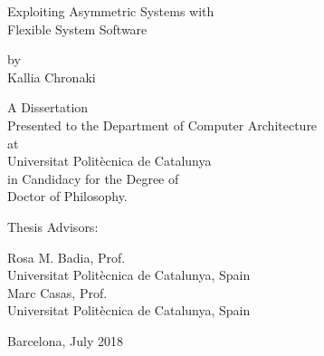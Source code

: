 \thispagestyle{empty}

\begin{center}

{\LARGE Exploiting Asymmetric Systems with \\
    \vspace{0.5em}
    Flexible System Software}

\vspace{1.0cm}

\begin{large}
    {\large by}\\
{\large Kallia Chronaki}\\
\vspace{.5cm}
\end{large}

\vspace{2.0cm}

{\large A Dissertation \\
    Presented to the Department of Computer Architecture \\
    at \\
    Universitat Polit\`ecnica de Catalunya\\
    in Candidacy for the Degree of \\
    Doctor of Philosophy.}
\end{center}

\vspace{2.2cm}%

{\large Thesis Advisors:}%

\vspace{1.0cm}%

{\hspace{0em} \large Rosa M. Badia, Prof.}\\
{\hspace*{1.4em} \large Universitat Polit\`ecnica de Catalunya, Spain}\\


\vspace*{1.0cm}%
{\hspace{0cm} \large Marc Casas, Prof.}\\
{\hspace*{1.4em} \large Universitat Polit\`ecnica de Catalunya, Spain}%
\vspace*{2.0cm}

\begin{center}
{\large Barcelona, July 2018}
\end{center}
